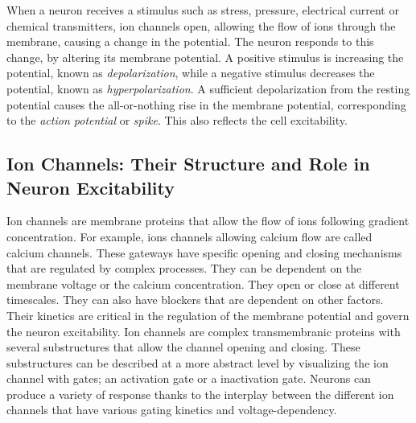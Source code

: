 When a neuron receives a stimulus such as stress, pressure, electrical current or chemical transmitters, ion channels open, allowing the flow of ions through the membrane, causing a change in the potential. The neuron responds to this change, by altering its membrane potential. A positive stimulus is increasing the potential, known as \textit{depolarization}, while a negative stimulus decreases the potential, known as \textit{hyperpolarization}. A sufficient depolarization from the resting potential causes the all-or-nothing rise in the membrane potential, corresponding to the \textit{action potential} or \textit{spike}. This also reflects the cell excitability.

\subsection{Ion Channels: Their Structure and Role in Neuron Excitability}
Ion channels are membrane proteins that allow the flow of ions following gradient concentration. For example, ions channels allowing calcium flow are called calcium channels. These gateways have specific opening and closing mechanisms that are regulated by complex processes. They can be dependent on the membrane voltage or the calcium concentration. They open or close at different timescales. They can also have blockers that are dependent on other factors. Their kinetics are critical in the regulation of the membrane potential and govern the neuron excitability. Ion channels are complex transmembranic proteins with several substructures that allow the channel opening and closing. These substructures can be described at a more abstract level by visualizing the ion channel with gates; an activation gate or a inactivation gate. Neurons can produce a variety of response thanks to the interplay between the different ion channels that have various gating kinetics and voltage-dependency.


